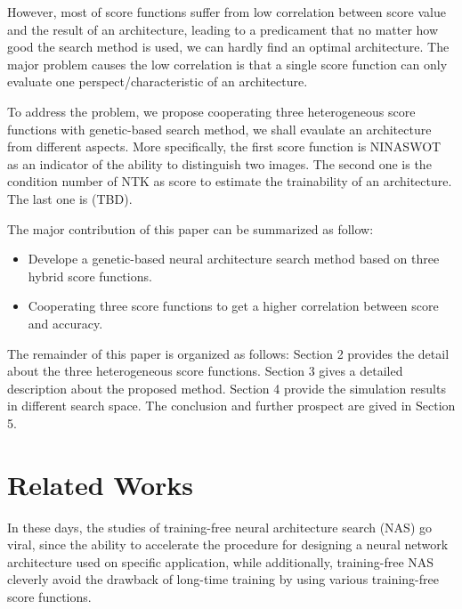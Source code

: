 \documentclass[sigconf]{acmart}
\begin{document}
    However, most of score functions suffer from low correlation between 
    score value and the result of an architecture, leading to a predicament 
    that no matter how good the search method is used, we can hardly find 
    an optimal architecture. 
    The major problem causes the low correlation is that a single score 
    function can only evaluate one perspect/characteristic of an architecture.
    
    To address the problem, we propose cooperating three heterogeneous score 
    functions with genetic-based search method, we shall evaulate an architecture 
    from different aspects. More specifically, the first score function is 
    NINASWOT \cite{10.1145/3491396.3506510} as an indicator of the ability 
    to distinguish two images. The second one is the condition number of NTK 
    \cite{https://doi.org/10.48550/arxiv.2102.11535} as score to estimate the 
    trainability of an architecture. The last one is (TBD).

    The major contribution of this paper can be summarized as follow:
    \begin{itemize}
        \item Develope a genetic-based neural architecture search method based on three hybrid score functions.
        \item Cooperating three score functions to get a higher correlation between score and accuracy.
    \end{itemize}

    The remainder of this paper is organized as follows: Section 2 provides the 
    detail about the three heterogeneous score functions. Section 3 gives a detailed 
    description about the proposed method. Section 4 provide the simulation results 
    in different search space. The conclusion and further prospect are gived in 
    Section 5.

    \section{Related Works}
    In these days, the studies of training-free neural architecture search (NAS) 
    go viral, since the ability to accelerate the procedure for designing a neural 
    network architecture used on specific application, while additionally, 
    training-free NAS cleverly avoid the drawback of long-time training by using 
    various training-free score functions. 
\end{document}
